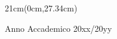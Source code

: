 \documentclass[a4paper,oneside,11pt]{book}
\renewcommand{\#}{\texttt{\symbol{`\#}}}
\theoremstyle{definition}
\begin{document}
\begin{textblock*}{21cm}(0cm,27.34cm)
	\centerline{Anno Accademico 20xx/20yy}
\end{textblock*}

\endgroup


\null\newpage
\thispagestyle{empty}
$ $


\pagestyle{plain}
\frontmatter

\tableofcontents
%
\newpage
$ $





%
\mainmatter





\cleardoublepage
{}
\printbibliography
\end{document}

